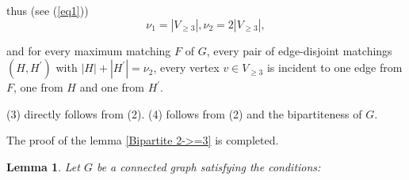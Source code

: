 \documentclass[fleqn,12pt,twoside]{article}
\newtheorem{lemma}{Lemma}
\newenvironment{proof}[1][Proof.]{\begin{trivlist}
\item[\hskip \labelsep {\bfseries #1}]}{\end{trivlist}}
\begin{document}
\begin{proof}
thus (see (\ref{eq1}))\begin{equation}
\nu _{1}=\left\vert V_{\geq 3}\right\vert ,\nu _{2}=2\left\vert
V_{\geq 3}\right\vert ,  \label{eq2}
\end{equation}

and for every maximum matching $F$ of $G$, every pair of
edge-disjoint matchings $(H,H^{\prime })$ with $\left\vert
H\right\vert +\left\vert H^{\prime }\right\vert =\nu _{2}$, every
vertex $v\in V_{\geq 3}$ is incident to one edge from $F$, one from
$H$ and one from $H^{\prime }$.

(3) directly follows from (2). (4) follows from (2) and the
bipartiteness of $G$.

The proof of the lemma \ref{Bipartite 2->=3} is completed.
\end{proof}


\begin{lemma}
\label{SystemInSubdivision}Let $G$ be a connected graph satisfying
the conditions:
\end{lemma}
\end{document}
